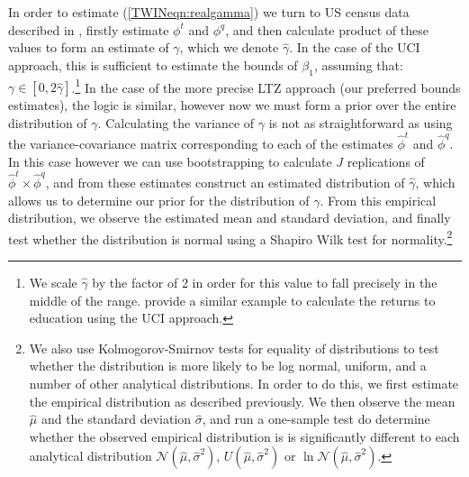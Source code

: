 \documentclass[subeqn]{article}
\begin{document}
\begin{spacing}{1.4}
In order to estimate (\ref{TWINeqn:realgamma}) we turn to US census data 
described in \citet{BhalotraVenkataramani2014}, firstly estimate $\phi^t$ and 
$\phi^q$, and then calculate product of these values to form an estimate of 
$\gamma$, which we denote $\hat\gamma$.  In the case of the UCI approach, this 
is sufficient to estimate the bounds of $\beta_1$, assuming that: 
$\gamma\in[0,2\hat\gamma]$.\footnote{We scale $\hat\gamma$ by the factor of 2 in 
order for this value to fall precisely in the middle of the range. 
\citet{Conleyetal2012} provide a similar example to calculate the returns to 
education using the UCI approach.} In the case of the more precise LTZ approach 
(our preferred bounds estimates), the logic is similar, however now we must form 
a prior over the entire distribution of $\gamma$.  Calculating the variance of 
$\gamma$ is not as straightforward as using the variance-covariance matrix 
corresponding to each of the estimates $\hat\phi^t$ and $\hat\phi^q$.  In this 
case however we can use bootstrapping to calculate $J$ replications of 
$\hat\phi^t\times\hat\phi^q$, and from these estimates construct an estimated 
distribution of $\hat\gamma$, which allows us to determine our prior for the 
distribution of $\gamma$.  From this empirical distribution, we observe the 
estimated mean and standard deviation, and finally test whether the distribution 
is normal using a Shapiro Wilk test for normality.\footnote{We also use 
Kolmogorov-Smirnov tests for equality of distributions to test whether the 
distribution is more likely to be log normal, uniform, and a number of other
analytical distributions. In order to do this, we first estimate the empirical 
distribution as described previously.  We then observe the mean $\hat\mu$ and 
the standard deviation $\hat\sigma$, and run a one-sample test do determine 
whether the observed empirical distribution is is significantly different to 
each analytical distribution $\mathcal{N}(\hat\mu,\hat\sigma^2)$, 
$U(\hat\mu,\hat\sigma^2)$ or $\ln\mathcal{N}(\hat\mu,\hat\sigma^2)$.}


\end{spacing}
\end{document}
